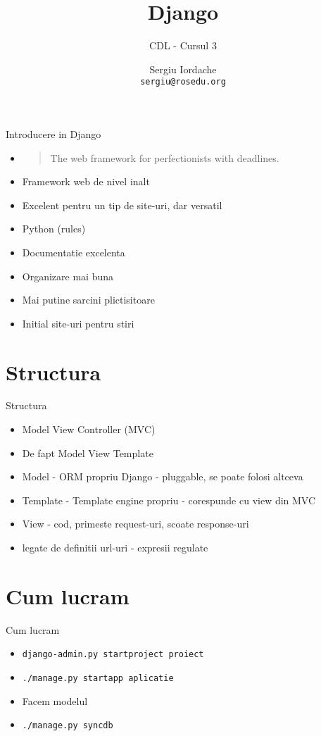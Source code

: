 \documentclass{beamer}
\title[]{Django}
\subtitle{CDL - Cursul 3}
\institute[]{ROSEdu}
\author[]{Sergiu Iordache \\ \texttt{sergiu@rosedu.org}}
\begin{document}
\maketitle

\tableofcontents

\begin{frame}{Introducere in Django}
  \begin{itemize}
    \item 
    \begin{quote}
    The web framework for perfectionists with deadlines.
    \end{quote} 
    \pause
    \item Framework web de nivel inalt
    \pause
    \item Excelent pentru un tip de site-uri, dar versatil
    \pause
    \item Python \pause (rules)
    \pause
    \item Documentatie excelenta
    \pause
    \item Organizare mai buna
    \pause
    \item Mai putine sarcini plictisitoare
    \pause
    \item Initial site-uri pentru stiri
  \end{itemize}
\end{frame}

\section{Structura}
\begin{frame}{Structura}
  \begin{itemize}
    \item Model View Controller (MVC)
    \pause
    \item De fapt Model View Template
    \pause
    \item Model - ORM propriu Django \pause - pluggable, se poate folosi altceva
    \pause
    \item Template - Template engine propriu \pause - corespunde cu view din MVC
    \pause
    \item View - cod, primeste request-uri, scoate response-uri
	\pause
    \item legate de definitii url-uri - expresii regulate 
  \end{itemize}
\end{frame}

\section{Cum lucram}
\begin{frame}{Cum lucram}
  \begin{itemize}
    \item \texttt{django-admin.py startproject proiect}
    \pause
    \item \texttt{./manage.py startapp aplicatie}
    \pause
    \item Facem modelul
    \pause
    \item \texttt{./manage.py syncdb}
  \end{itemize}
\end{frame}
\end{document}
